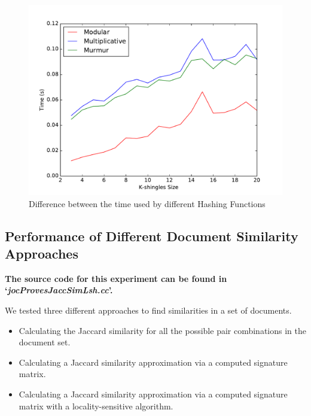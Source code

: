 \documentclass[12pt]{article}
\begin{document}
{\begin{figure}[H]
	\centering
	\includegraphics[scale=0.55]{graphs/HashFunctionsJaccardAproxTime.pdf} 
	\caption{Difference between the time used by different Hashing Functions}
	\label{fig:HhashFunctionsTime}
\end{figure}


\subsection{Performance of Different Document Similarity Approaches}
\textbf{The source code for this experiment can be found in `\textit{jocProvesJaccSimLsh.cc}'.}
\bigskip

We tested three different approaches to find similarities in a set of documents.
\begin{itemize}
\item Calculating the Jaccard similarity for all the possible pair combinations in the document set.
\item Calculating a Jaccard similarity approximation via a computed signature matrix.
\item Calculating a Jaccard similarity approximation via a computed signature matrix with a locality-sensitive algorithm.
\end{itemize}

}
\end{document}
